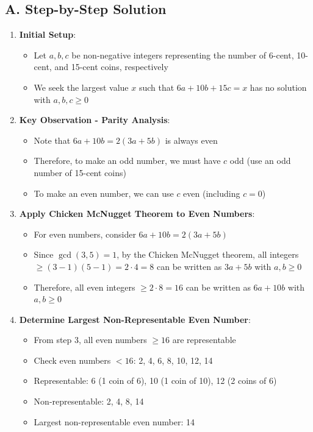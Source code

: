 \documentclass[12pt]{article}
\begin{document}
\begin{solutionbox}
\subsection*{A. Step-by-Step Solution}
\begin{enumerate}[leftmargin=*]
    \item \textbf{Initial Setup}: 
    \begin{itemize}
        \item Let $a, b, c$ be non-negative integers representing the number of 6-cent, 10-cent, and 15-cent coins, respectively
        \item We seek the largest value $x$ such that $6a + 10b + 15c = x$ has no solution with $a, b, c \geq 0$
    \end{itemize}
    
    \item \textbf{Key Observation - Parity Analysis}: 
    \begin{itemize}
        \item Note that $6a + 10b = 2(3a + 5b)$ is always even
        \item Therefore, to make an odd number, we must have $c$ odd (use an odd number of 15-cent coins)
        \item To make an even number, we can use $c$ even (including $c = 0$)
    \end{itemize}
    
    \item \textbf{Apply Chicken McNugget Theorem to Even Numbers}:
    \begin{itemize}
        \item For even numbers, consider $6a + 10b = 2(3a + 5b)$
        \item Since $\gcd(3, 5) = 1$, by the Chicken McNugget theorem, all integers $\geq (3-1)(5-1) = 2 \cdot 4 = 8$ can be written as $3a + 5b$ with $a, b \geq 0$
        \item Therefore, all even integers $\geq 2 \cdot 8 = 16$ can be written as $6a + 10b$ with $a, b \geq 0$
    \end{itemize}
    
    \item \textbf{Determine Largest Non-Representable Even Number}:
    \begin{itemize}
        \item From step 3, all even numbers $\geq 16$ are representable
        \item Check even numbers $< 16$: 2, 4, 6, 8, 10, 12, 14
        \item Representable: 6 (1 coin of 6), 10 (1 coin of 10), 12 (2 coins of 6)
        \item Non-representable: 2, 4, 8, 14
        \item Largest non-representable even number: 14
    \end{itemize}
    

\end{enumerate}
\end{solutionbox}
\end{document}
